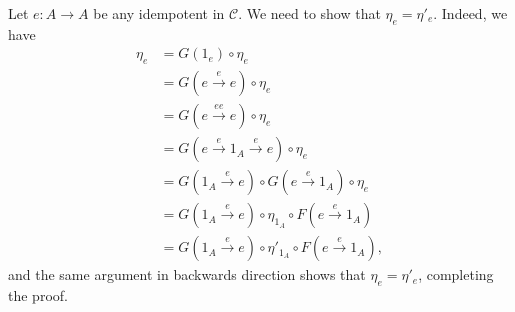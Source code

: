 Let $e\colon A\to A$ be any idempotent in $\mathcal{C}$. We need to show that
$\eta_e = \eta'_e$. Indeed, we have
\begin{align*}
	\eta_e &= G(1_e) \circ \eta_e\\
	&= G(e\stackrel{e}{\longrightarrow}e) \circ \eta_e\\
	&= G(e\stackrel{ee}{\longrightarrow}e)\circ \eta_e\\
	&= G(e\stackrel{e}{\longrightarrow}1_A\stackrel{e}{\longrightarrow}e)\circ\eta_e\\
	&= G(1_A\stackrel{e}{\longrightarrow}e)\circ G(e\stackrel{e}{\longrightarrow}1_A)\circ \eta_e\\
	&= G(1_A\stackrel{e}{\longrightarrow}e)\circ\eta_{1_A}\circ F(e\stackrel{e}{\longrightarrow}1_A)\\
	&= G(1_A\stackrel{e}{\longrightarrow}e)\circ\eta'_{1_A}\circ F(e\stackrel{e}{\longrightarrow}1_A),
\end{align*}
and the same argument in backwards direction shows that $\eta_e = \eta'_e$,
completing the proof.
